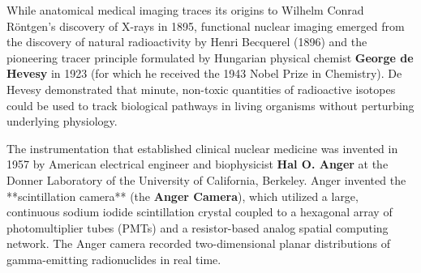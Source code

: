 \documentclass[11pt,a4paper]{article}
\begin{document}
While anatomical medical imaging traces its origins to Wilhelm Conrad Röntgen's discovery of X-rays in 1895, functional nuclear imaging emerged from the discovery of natural radioactivity by Henri Becquerel (1896) and the pioneering tracer principle formulated by Hungarian physical chemist \textbf{George de Hevesy} in 1923 (for which he received the 1943 Nobel Prize in Chemistry). De Hevesy demonstrated that minute, non-toxic quantities of radioactive isotopes could be used to track biological pathways in living organisms without perturbing underlying physiology.

The instrumentation that established clinical nuclear medicine was invented in 1957 by American electrical engineer and biophysicist \textbf{Hal O. Anger} at the Donner Laboratory of the University of California, Berkeley. Anger invented the **scintillation camera** (the \textbf{Anger Camera}), which utilized a large, continuous sodium iodide scintillation crystal coupled to a hexagonal array of photomultiplier tubes (PMTs) and a resistor-based analog spatial computing network. The Anger camera recorded two-dimensional planar distributions of gamma-emitting radionuclides in real time.
\end{document}
